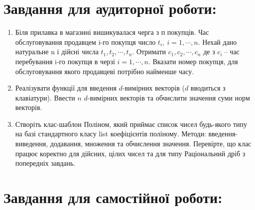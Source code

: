 \documentclass[a5paper,titlepage,openany,twoside,draft]{book_unv}%
\begin{document}
\section{Завдання для аудиторної роботи:}

\begin{enumerate}
\def\labelenumi{\arabic{enumi})}

\item
  Біля прилавка в магазині вишикувалася черга з п покупців. Час
  обслуговування продавцем i-го покупця число
  \(t_{i},\ i = 1,\cdots,n\). Нехай дано натуральне n і дійсні числа
  \(t_{1},t_{2},\cdots,t_{n}\). Отримати \(c_{1},c_{2},\cdots,c_{n}\) де
  з \(c_{i}\ \)-- час перебування i-го покупця в черзі
  \(i = 1,\cdots,n\). Вказати номер покупця, для обслуговування якого
  продавцеві потрібно найменше часу.
\item
Реалізувати функції для введення $d$-вимірних векторів 
($d$ вводиться з клавіатури). Ввести $n$ $d$-вимірних векторів
 та обчислити значення суми норм векторів.

\item
  Створіть клас-шаблон Поліном, який приймає список чисел будь-якого
  типу на базі стандартного класу list коефіцієнтів
  поліному. Методи: введення-виведення, додавання, множення та
  обчислення значення. Перевірте, що клас працює коректно для дійсних,
  цілих чисел та для типу Раціональний дріб з попередніх завдань.


\end{enumerate}

\section{Завдання для самостійної роботи:}
\end{document}
